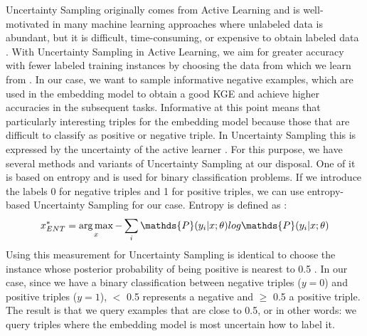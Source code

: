 Uncertainty Sampling originally comes from Active Learning and is well-motivated in many machine learning approaches where unlabeled data is abundant, but it is difficult, time-consuming, or expensive to obtain labeled data \cite{Settles2009ActiveLL}.
With Uncertainty Sampling in Active Learning, we aim for greater accuracy with fewer labeled training instances by choosing the data from which we learn from \cite{Settles2009ActiveLL}.
In our case, we want to sample informative negative examples, which are used in the embedding model to obtain a good \ac{KGE} and achieve higher accuracies in the subsequent tasks. 
Informative at this point means that  particularly interesting triples for the embedding model because those that are difficult to classify as positive or negative triple.
In Uncertainty Sampling this is expressed by the uncertainty of the active learner \cite{Settles2009ActiveLL}.
For this purpose, we have several methods and variants of Uncertainty Sampling at our disposal.
One of it is based on entropy and is used for binary classification problems.
If we introduce the labels 0 for negative triples and 1 for positive triples, we can use entropy-based Uncertainty Sampling for our case.
Entropy is defined as \cite{Settles2009ActiveLL}:
\begin{equation}
    x^{*}_{ENT} = \argmax_{x} - \sum_{i}{\mathds{P}(y_i | x; \theta) log \mathds{P}(y_i|x; \theta)}
\end{equation}
Using this measurement for Uncertainty Sampling is identical to choose the instance whose posterior probability of being positive is nearest to 0.5 \cite{Settles2009ActiveLL}.
In our case, since we have a binary classification between negative triples ($y=0$) and positive triples ($y=1$), $<$ 0.5 represents a negative and $\geq$ 0.5 a positive triple.
The result is that we query examples that are close to 0.5, or in other words: 
we query triples where the embedding model is most uncertain how to label it.

